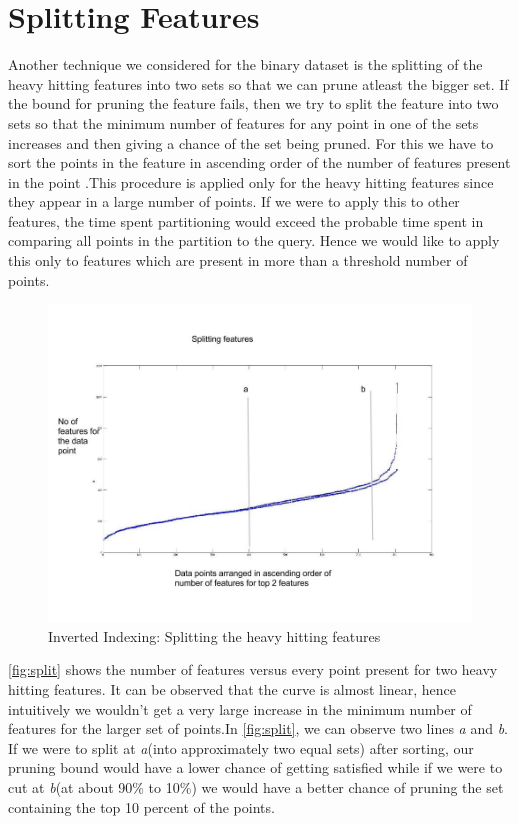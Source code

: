 \section{Splitting Features}

Another technique we considered for the binary dataset is the splitting of the heavy hitting features into two sets so that we can prune atleast the bigger set. If the bound for pruning the feature fails, then we try to split the feature into two sets so that the minimum number of features for any point in one of the sets increases and then giving a chance of the set being pruned. For this we have to sort the points in the feature in ascending order of the number of features present in the point .This procedure is applied only for the heavy hitting features since they appear in a large number of points. If we were to apply this to other features, the time spent partitioning would exceed the probable time spent in comparing all points in the partition to the query. Hence we would like to apply this only to features which are present in more than a threshold number of points.\\

\begin{figure}[ht]	
\centering
\includegraphics[width=1 \columnwidth]{img/feat_split.jpg}
\caption{Inverted Indexing: Splitting the heavy hitting features}
\label{fig:split}
\end{figure}

\autoref{fig:split} shows the number of features versus every point present for two heavy hitting features. It can be observed that the curve is almost linear, hence intuitively we wouldn't get a very large increase in the minimum number of features for the larger set of points.In \autoref{fig:split}, we can observe two lines \textit{a} and \textit{b}. If we were to split at \textit{a}(into approximately two equal sets) after sorting, our pruning bound would have a lower chance of getting  satisfied while if we were to cut at \textit{b}(at about 90\% to 10\%) we would have a better chance of pruning the set containing the top 10 percent of the points.